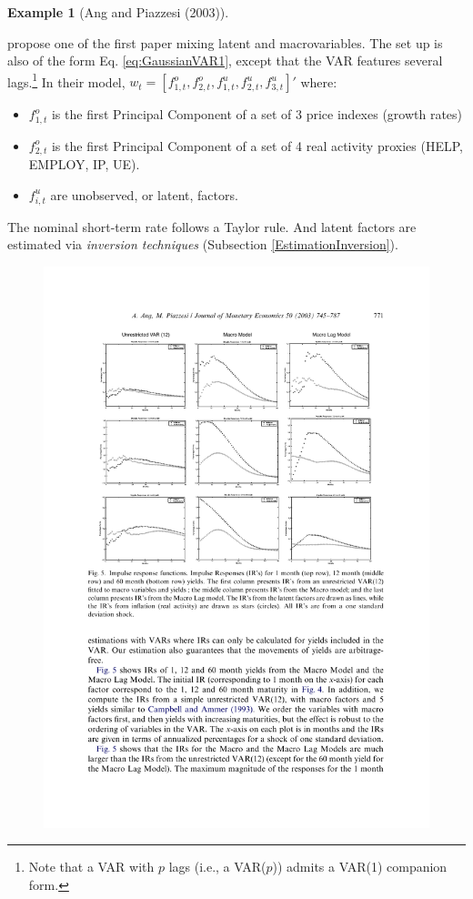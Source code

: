 \documentclass[
  12pt,
]{book}
\providecommand{\tightlist}{%
  \setlength{\itemsep}{0pt}\setlength{\parskip}{0pt}}
\theoremstyle{definition}
\theoremstyle{definition}
\newtheorem{example}{Example}[chapter]
\theoremstyle{definition}
\theoremstyle{definition}
\theoremstyle{remark}
\begin{document}
\begin{example}[Ang and Piazzesi (2003)]
\protect\hypertarget{exm:AngPiazzesi}{}\label{exm:AngPiazzesi}

\citet{Ang_Piazzesi_2003} propose one of the first paper mixing latent and macrovariables. The set up is also of the form Eq. \eqref{eq:GaussianVAR1}, except that the VAR features several lags.\footnote{Note that a VAR with \(p\) lags (i.e., a VAR(\(p\))) admits a VAR(1) companion form.} In their model, \(w_t = [f^{o}_{1,t},f^{o}_{2,t},f^{u}_{1,t},f^{u}_{2,t},f^{u}_{3,t}]'\) where:

\begin{itemize}
\tightlist
\item
  \(f^{o}_{1,t}\) is the first Principal Component of a set of 3 price indexes (growth rates)
\item
  \(f^{o}_{2,t}\) is the first Principal Component of a set of 4 real activity proxies (HELP, EMPLOY, IP, UE).
\item
  \(f^{u}_{i,t}\) are unobserved, or latent, factors.
\end{itemize}

The nominal short-term rate follows a Taylor rule. And latent factors are estimated via \emph{inversion techniques} (Subsection \ref{EstimationInversion}).

\begin{figure}

{\centering \includegraphics[width=0.95\linewidth]{figures/AngPiazzesi1} 

}
\end{figure}
\end{example}
\end{document}

